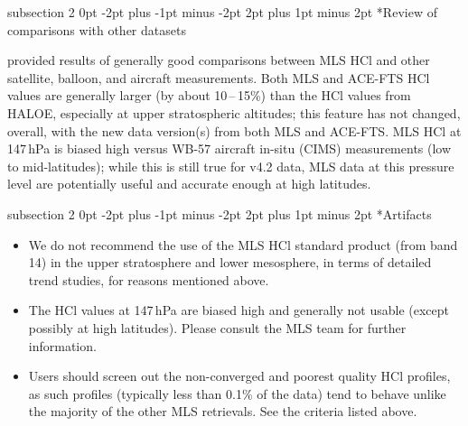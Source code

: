 \documentclass[11pt,draft]{report}
\makeatletter
\renewcommand{\subsection}{\@startsection%
  {subsection}%
  {2}%
  {0pt}%
  {-2pt plus -1pt minus -2pt}%
  {2pt plus 1pt minus 2pt}%
  {\large\sffamily\fontseries{sb}\selectfont\flushleft\color{SectionColor}\figureversion{tabular}}}%
\makeatother
\begin{document}
\subsection*{Review of comparisons with other datasets}

\citet{FroidevauxEtal08HCl} provided results of generally good
comparisons between MLS HCl and other satellite, balloon, and aircraft
measurements.  Both MLS and ACE-FTS HCl values are generally larger (by
about 10\,--\,15\%) than the HCl values from HALOE, especially at upper
stratospheric altitudes; this feature has not changed, overall, with the
new data version(s) from both MLS and ACE-FTS.  MLS HCl at 147\,hPa is
biased high versus WB-57 aircraft in-situ (CIMS) measurements (low to
mid-latitudes); while this is still true for v4.2 data, MLS data at this
pressure level are potentially useful and accurate enough at high
latitudes.

\subsection*{Artifacts}
\begin{itemize} 
\item We do not recommend the use of the MLS HCl standard product (from
  band 14) in the upper stratosphere and lower mesosphere, in terms of
  detailed trend studies, for reasons mentioned above.
\item The HCl values at 147\,hPa are biased high and generally not
  usable (except possibly at high latitudes).  Please consult the MLS
  team for further information.
\item Users should screen out the non-converged and poorest quality HCl
  profiles, as such profiles (typically less than 0.1\% of the data)
  tend to behave unlike the majority of the other MLS retrievals.  See
  the criteria listed above.
\end{itemize}  
\end{document}
